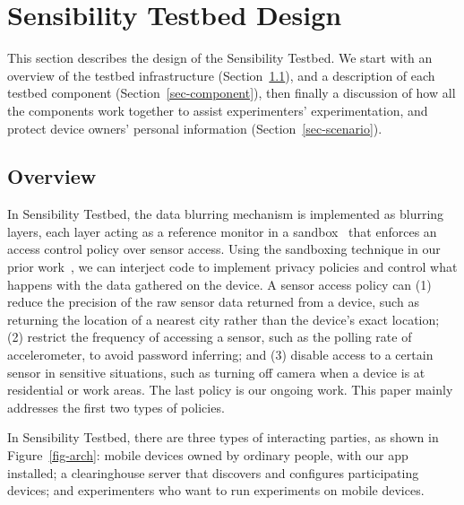\section{Sensibility Testbed Design}\label{sec-design}

This section describes the design of the Sensibility Testbed. 
We start with
an overview of the testbed infrastructure (Section~\ref{sec-overview}), 
and a description of each testbed component 
(Section~\ref{sec-component}), then finally a discussion of how all the 
components work together to assist experimenters' experimentation,
and protect device owners' personal information 
(Section~\ref{sec-scenario}).


\subsection{Overview}\label{sec-overview}

In Sensibility Testbed, the data blurring 
mechanism is implemented as blurring layers, each layer acting as a 
reference monitor in a sandbox~\cite{ref} that enforces an access 
control policy over sensor access. Using the sandboxing 
technique in our prior work~\cite{cappos2010retaining}, we can 
interject code to implement privacy policies and control what 
happens with the data gathered on the device. A sensor access 
policy can (1) reduce 
the precision of the raw sensor data returned from a device, such
as returning the location of a nearest city rather than the device's exact location; (2) restrict 
the frequency of accessing a sensor, such as the polling rate of 
accelerometer, to avoid password inferring; and (3) disable  
access to a certain sensor in sensitive situations, such as 
turning off camera when a device is at residential or work areas.
The last policy is our ongoing work. This paper mainly addresses
the first two types of policies. 

In Sensibility Testbed, there are three types of interacting
parties, as shown in Figure~\ref{fig-arch}: mobile devices 
owned by ordinary people, with our app installed; a 
clearinghouse server that discovers and configures
participating devices; and experimenters who want to run
experiments on mobile devices. 

